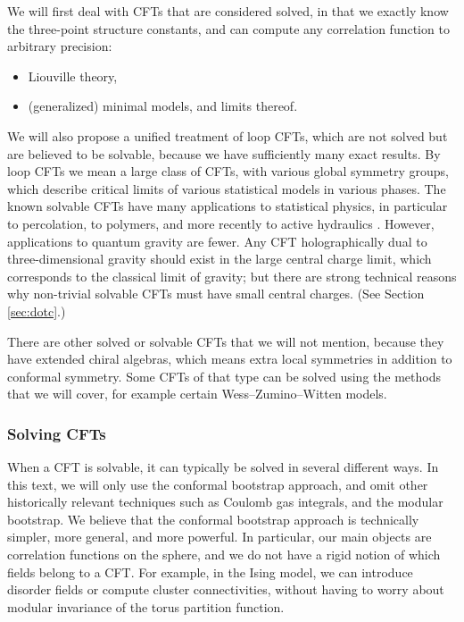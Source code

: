 \documentclass[12pt, a4paper]{article}
\theoremstyle{break}
\begin{document}
We will first deal with CFTs that are considered solved, in that we exactly know the three-point structure constants, and can compute any correlation function to arbitrary precision:
\begin{itemize}
 \item Liouville theory,
 \item (generalized) minimal models, and limits thereof. 
\end{itemize}
We will also propose a unified treatment of loop CFTs, which are not solved but are believed to be solvable, because we have sufficiently many exact results. By loop CFTs we mean a large class of CFTs, with various global symmetry groups, which describe critical limits of various statistical models in various phases. The known solvable CFTs have many applications to statistical physics, in particular to percolation, to polymers, and more recently to active hydraulics \cite{jcpb23}. 
However, applications to quantum gravity are fewer. Any CFT holographically dual to three-dimensional gravity should exist in the large central charge limit, which corresponds to the classical limit of gravity; but there are strong technical reasons why non-trivial solvable CFTs must have small central charges. (See Section \ref{sec:dotc}.) 

There are other solved or solvable CFTs that we will not mention, because they have extended chiral algebras, which means extra local symmetries in addition to conformal symmetry. Some CFTs of that type can be solved using the methods that we will cover, for example certain Wess--Zumino--Witten models. 

\subsubsection*{Solving CFTs}

When a CFT is solvable, it can typically be solved in several different ways. In this text, we will only use the conformal bootstrap approach, and omit other historically relevant techniques such as Coulomb gas integrals, and the modular bootstrap. We believe that the conformal bootstrap approach is technically simpler, more general, and more powerful. In particular, our main objects are correlation functions on the sphere, and we do not have a rigid notion of which fields belong to a CFT. For example, in the Ising model, we can introduce disorder fields or compute cluster connectivities, without having to worry about modular invariance of the torus partition function. 
\end{document}
